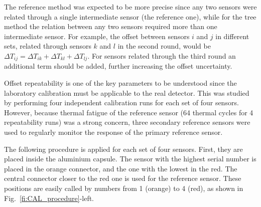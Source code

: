 The reference method was expected to be more precise since any two sensors were related through a single intermediate sensor (the reference one), while for the tree method the relation between any two sensors required more than one intermediate sensor. For example, the offset between sensors $i$ and $j$ in different sets, related through sensors $k$ and $l$ in the second round, would be $\Delta T_{ij} = \Delta T_{ik} + \Delta T_{kl} + \Delta T_{lj}$. For sensors related through the third round an additional term should be added, further increasing the offset uncertainty. 

Offset repeatability is one of the key parameters to be understood since the laboratory calibration must be applicable to the real detector. This was studied by performing four independent calibration runs for each set of four sensors. However, because thermal fatigue of the reference sensor (64 thermal cycles for 4 repeatability runs) was a strong concern, three secondary reference sensors were used to regularly monitor the response of the primary reference sensor. 

The following procedure is applied for each set of four sensors. First, they are placed inside the aluminium capsule. The sensor with the highest serial number is placed in the orange connector, and the one with the lowest in the red. The central connector closer to the red one is used for the reference sensor. These positions are easily called by numbers from 1 (orange) to 4 (red), as shown in Fig.~\ref{fi:CAL_procedure}-left.

